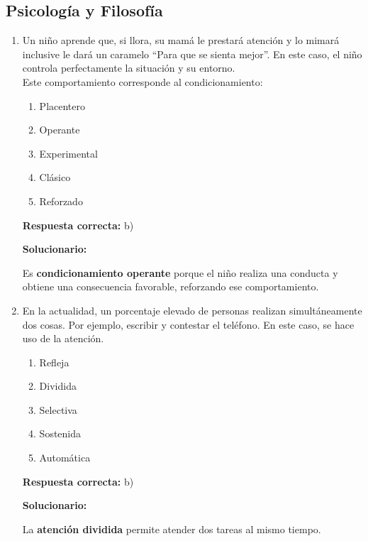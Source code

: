 \subsection*{Psicología y Filosofía}

\begin{enumerate}[resume]
	
	
	\item Un niño aprende que, si llora, su mamá le prestará atención y lo mimará inclusive le dará un caramelo “Para que se sienta mejor”. En este caso, el niño controla perfectamente la situación y su entorno.\\
	Este comportamiento corresponde al condicionamiento:
	\begin{enumerate}[label=\alph*)]
		\item Placentero
		\item Operante
		\item Experimental
		\item Clásico
		\item Reforzado
	\end{enumerate}
	\textbf{Respuesta correcta:} b)
	
	\vspace{2mm}
	\textbf{Solucionario:}
	
	Es \textbf{condicionamiento operante} porque el niño realiza una conducta y obtiene una consecuencia favorable, reforzando ese comportamiento.
	
	\vspace{6mm}
	
	\item En la actualidad, un porcentaje elevado de personas realizan simultáneamente dos cosas. Por ejemplo, escribir y contestar el teléfono. En este caso, se hace uso de la atención.
	\begin{enumerate}[label=\alph*)]
		\item Refleja
		\item Dividida
		\item Selectiva
		\item Sostenida
		\item Automática
	\end{enumerate}
	\textbf{Respuesta correcta:} b)
	
	\vspace{2mm}
	\textbf{Solucionario:}
	
	La \textbf{atención dividida} permite atender dos tareas al mismo tiempo.
	
	\vspace{6mm}
	

\end{enumerate}
